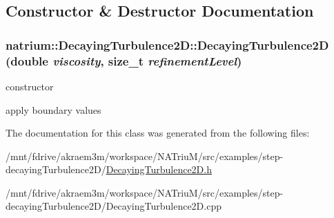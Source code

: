 \subsection{Constructor \& Destructor Documentation}
\hypertarget{classnatrium_1_1DecayingTurbulence2D_af1aebee0f89465ec385a1a749f0ceb76}{
\subsubsection[{DecayingTurbulence2D}]{\setlength{\rightskip}{0pt plus 5cm}natrium::DecayingTurbulence2D::DecayingTurbulence2D (double {\em viscosity}, \/  size\_\-t {\em refinementLevel})}}
\label{classnatrium_1_1DecayingTurbulence2D_af1aebee0f89465ec385a1a749f0ceb76}


constructor 

apply boundary values 

The documentation for this class was generated from the following files:\begin{DoxyCompactItemize}
\item 
/mnt/fdrive/akraem3m/workspace/NATriuM/src/examples/step-\/decayingTurbulence2D/\hyperlink{DecayingTurbulence2D_8h}{DecayingTurbulence2D.h}\item 
/mnt/fdrive/akraem3m/workspace/NATriuM/src/examples/step-\/decayingTurbulence2D/DecayingTurbulence2D.cpp\end{DoxyCompactItemize}

